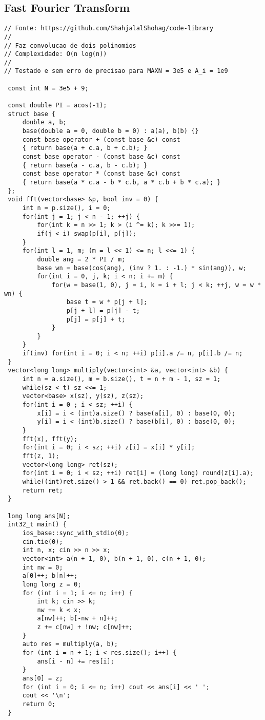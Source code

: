 \documentclass[11pt, a4paper, twoside]{article}
\begin{document}
\subsection{Fast Fourier Transform}
\begin{lstlisting}
// Fonte: https://github.com/ShahjalalShohag/code-library
//
// Faz convolucao de dois polinomios
// Complexidade: O(n log(n))
//
// Testado e sem erro de precisao para MAXN = 3e5 e A_i = 1e9

 const int N = 3e5 + 9;
 
 const double PI = acos(-1);
 struct base {
     double a, b;
     base(double a = 0, double b = 0) : a(a), b(b) {}
     const base operator + (const base &c) const
     { return base(a + c.a, b + c.b); }
     const base operator - (const base &c) const
     { return base(a - c.a, b - c.b); }
     const base operator * (const base &c) const
     { return base(a * c.a - b * c.b, a * c.b + b * c.a); }
 };
 void fft(vector<base> &p, bool inv = 0) {
     int n = p.size(), i = 0;
     for(int j = 1; j < n - 1; ++j) {
         for(int k = n >> 1; k > (i ^= k); k >>= 1);
         if(j < i) swap(p[i], p[j]);
     }
     for(int l = 1, m; (m = l << 1) <= n; l <<= 1) {
         double ang = 2 * PI / m;
         base wn = base(cos(ang), (inv ? 1. : -1.) * sin(ang)), w;
         for(int i = 0, j, k; i < n; i += m) {
             for(w = base(1, 0), j = i, k = i + l; j < k; ++j, w = w * wn) {
                 base t = w * p[j + l];
                 p[j + l] = p[j] - t;
                 p[j] = p[j] + t;
             }
         }
     }
     if(inv) for(int i = 0; i < n; ++i) p[i].a /= n, p[i].b /= n;
 }
 vector<long long> multiply(vector<int> &a, vector<int> &b) {
     int n = a.size(), m = b.size(), t = n + m - 1, sz = 1;
     while(sz < t) sz <<= 1;
     vector<base> x(sz), y(sz), z(sz);
     for(int i = 0 ; i < sz; ++i) {
         x[i] = i < (int)a.size() ? base(a[i], 0) : base(0, 0);
         y[i] = i < (int)b.size() ? base(b[i], 0) : base(0, 0);
     }
     fft(x), fft(y);
     for(int i = 0; i < sz; ++i) z[i] = x[i] * y[i];
     fft(z, 1);
     vector<long long> ret(sz);
     for(int i = 0; i < sz; ++i) ret[i] = (long long) round(z[i].a);
     while((int)ret.size() > 1 && ret.back() == 0) ret.pop_back();
     return ret;
 }
 
 long long ans[N];
 int32_t main() {
     ios_base::sync_with_stdio(0);
     cin.tie(0);
     int n, x; cin >> n >> x;
     vector<int> a(n + 1, 0), b(n + 1, 0), c(n + 1, 0);
     int nw = 0;
     a[0]++; b[n]++;
     long long z = 0;
     for (int i = 1; i <= n; i++) {
         int k; cin >> k;
         nw += k < x;
         a[nw]++; b[-nw + n]++;
         z += c[nw] + !nw; c[nw]++;
     }
     auto res = multiply(a, b);
     for (int i = n + 1; i < res.size(); i++) {
         ans[i - n] += res[i];
     }
     ans[0] = z;
     for (int i = 0; i <= n; i++) cout << ans[i] << ' ';
     cout << '\n';
     return 0;
 }
\end{lstlisting}
\end{document}
